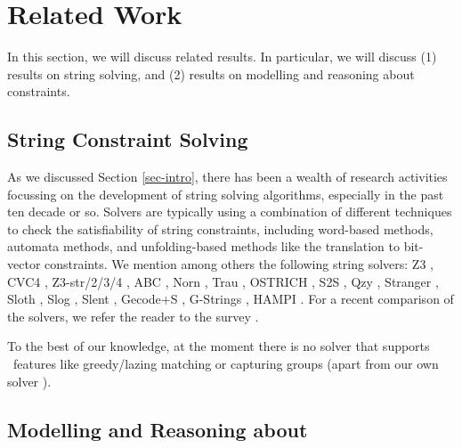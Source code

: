 \section{Related Work}
\label{sec-related}

In this section, we will discuss related results. In particular, we will discuss
(1) results on string solving, and (2) results on modelling and reasoning about 
\regexp{} constraints. 

\subsection{String Constraint Solving}
As we discussed Section \ref{sec-intro}, there has been a wealth of research
activities focussing on the development of string solving algorithms, especially
in the past ten decade or so. Solvers are typically using a combination
of different techniques to check the satisfiability of string constraints,
including word-based methods, automata methods, and unfolding-based methods
like the translation to bit-vector constraints.
We mention among others the following string solvers:
Z3 \cite{Z3}, CVC4 \cite{cvc4}, Z3-str/2/3/4 \cite{Z3-str,Z3-str2,Z3-str3,BerzishMurphy2021},
 ABC \cite{ABC}, Norn
\cite{Abdulla14}, Trau \cite{Z3-trau,AbdullaACDHRR18-trau,Abdulla17}, OSTRICH
\cite{CHL+19}, S2S \cite{DBLP:conf/aplas/LeH18}, Qzy \cite{cox2017model}, Stranger \cite{Stranger}, Sloth
\cite{HJLRV18,AbdullaA+19},
Slog \cite{fang-yu-circuits}, Slent \cite{WC+18}, Gecode+S \cite{DBLP:conf/cpaior/ScottFPS17}, G-Strings \cite{DBLP:conf/cp/AmadiniGST17}, HAMPI
\cite{HAMPI}. For a recent comparison of the solvers, we refer the
reader to the survey \cite{Ama20}.

To the best of our knowledge, at the moment there is no solver that
supports \regexp\ features like greedy/lazing matching or capturing
groups (apart from our own solver \ostrich).

\subsection{Modelling and Reasoning about \regexp{}}


